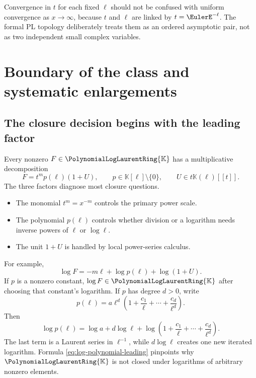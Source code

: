 \documentclass[11pt,oneside]{article}
\numberwithin{equation}{section}
\theoremstyle{definition}
\newcommand{\K}{\mathbb{K}}
\newcommand{\PL}{\PolynomialLogLaurentRing{\K}}
\begin{document}
Convergence in \(t\) for each fixed \(\ell\) should not be confused with
uniform convergence as \(x\to\infty\), because \(t\) and \(\ell\) are linked by
\(t=\EulerE^{-\ell}\).  The formal PL topology deliberately treats them as an ordered
asymptotic pair, not as two independent small complex variables.

\section{Boundary of the class and systematic enlargements}\label{sec:extensions}

\subsection{The closure decision begins with the leading factor}

Every nonzero \(F\in\PL\) has a multiplicative decomposition
\begin{equation}\label{eq:PL-factorization}
  F=t^m p(\ell)(1+U),
  \qquad p\in\K[\ell]\setminus\{0\},
  \qquad U\in t\K(\ell)[[t]].
\end{equation}
The three factors diagnose most closure questions.
\begin{itemize}
\item The monomial \(t^m=x^{-m}\) controls the primary power scale.
\item The polynomial \(p(\ell)\) controls whether division or a logarithm needs
  inverse powers of \(\ell\) or \(\log\ell\).
\item The unit \(1+U\) is handled by local power-series calculus.
\end{itemize}

For example,
\begin{equation}\label{eq:log-factorization}
  \log F=-m\ell+\log p(\ell)+\log(1+U).
\end{equation}
If \(p\) is a nonzero constant, \(\log F\in\PL\) after choosing that constant's
logarithm.  If \(p\) has degree \(d>0\), write
\[
  p(\ell)=a\ell^d\left(1+\frac{c_1}{\ell}+\cdots+
  \frac{c_d}{\ell^d}\right).
\]
Then
\begin{equation}\label{eq:log-polynomial-leading}
  \log p(\ell)=\log a+d\log\ell+
  \log\left(1+\frac{c_1}{\ell}+\cdots+
  \frac{c_d}{\ell^d}\right).
\end{equation}
The last term is a Laurent series in \(\ell^{-1}\), while \(d\log\ell\) creates
one new iterated logarithm.  Formula \eqref{eq:log-polynomial-leading} pinpoints
why \(\PL\) is not closed under logarithms of arbitrary nonzero elements.
\end{document}
